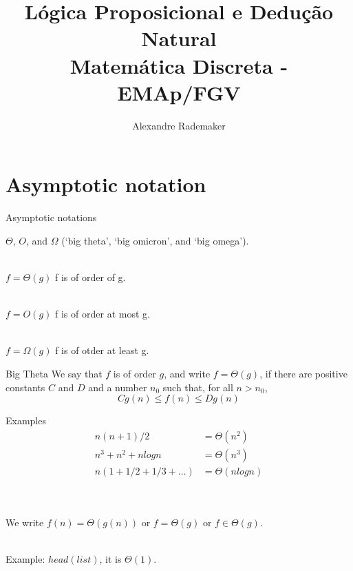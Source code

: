 \documentclass{beamer}
\title{Lógica Proposicional e Dedução Natural \\ 
 Matemática Discreta - EMAp/FGV}
\author{Alexandre Rademaker}
\begin{document}
\frame{\titlepage}
\usebackgroundtemplate{}

\section{Asymptotic notation}


\begin{frame}[fragile]{Asymptotic notations}

  $\Theta$, $O$, and $\Omega$ (‘big theta’, ‘big omicron’, and ‘big
  omega’).\\~\

  $f = \Theta(g)$ f is of order of g.\\~\

  $f = O(g)$ f is of order at most g.\\~\

  $f = \Omega(g)$ f is of otder at least g.

\end{frame}

\begin{frame}{Big Theta}
  We say that $f$ is of order $g$, and write $f = \Theta(g)$, if there
  are positive constants $C$ and $D$ and a number $n_0$ such that, for
  all $n > n_0$,
  \[ Cg(n) \leq f(n) \leq D g(n) \] 
  
  Examples
  \begin{equation*}
    \begin{split}
      n(n+1)/2 &=\Theta(n^2)\\
      n^3 +n^2 + n log n &= \Theta(n^3)\\
      n (1+1/2+1/3+\ldots) &= \Theta(n log n)
    \end{split}
  \end{equation*}\\~\

  We write $f(n) = \Theta(g(n))$ or $f = \Theta(g)$ or $f \in \Theta(g)$.\\~\

  Example: $head(list)$, it is $\Theta(1)$.
\end{frame}
\end{document}
